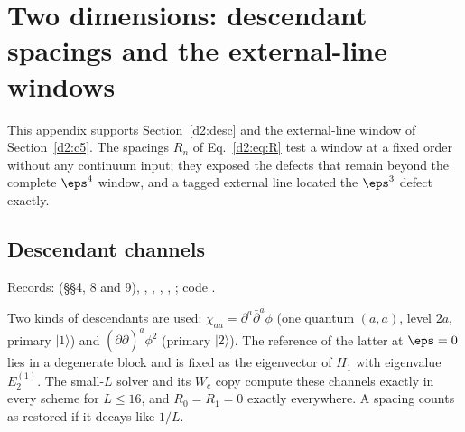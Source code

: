 \section{Two dimensions: descendant spacings and the external-line windows}\label{d2:app:legs}

This appendix supports Section~\ref{d2:desc} and the external-line window of Section~\ref{d2:c5}. The spacings $R_n$ of
Eq.~\eqref{d2:eq:R} test a window at a fixed order without any continuum input; they exposed the defects that remain beyond
the complete $\eps^4$ window, and a tagged external line located the $\eps^3$ defect exactly.

\subsection{Descendant channels}\label{d2:app:desc}
{\small\raggedright\noindent Records:  (\S\S4, 8 and 9),
,
, ,
, ; code .\par}

Two kinds of descendants are used: $\chi_{aa}=\partial^a\bar\partial^a\phi$ (one quantum $(a,a)$, level $2a$, primary
$|1\rangle$) and $(\partial\bar\partial)^a\phi^2$ (primary $|2\rangle$). The reference of the latter at $\eps=0$ lies in a
degenerate block and is fixed as the eigenvector of $H_1$ with eigenvalue $E_2^{(1)}$. The small-$L$ solver
 and its $W_c$ copy  compute these channels exactly in every scheme for
$L\le16$, and $R_0=R_1=0$ exactly everywhere. A spacing counts as restored if it decays like $1/L$.

